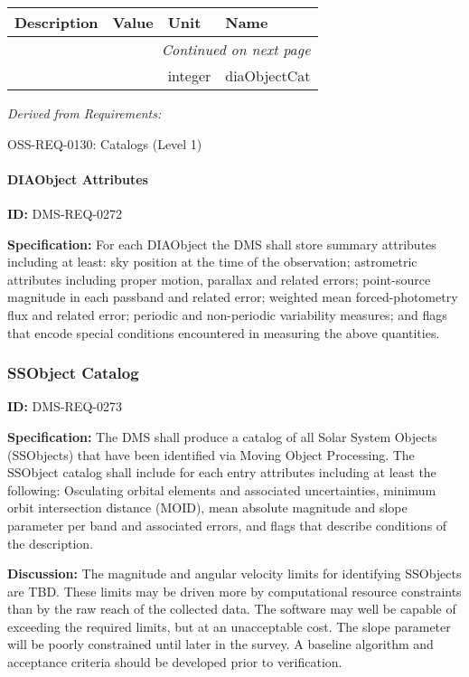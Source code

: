 \documentclass[SE,toc,lsstdraft]{lsstdoc}
\makeatletter
\newcommand{\paramname}[1]{\hspace{0pt}#1}
\newcommand{\unitname}[1]{\hspace{0pt}#1}
\newenvironment{parameters}[0]{%
\setlength\LTleft{0pt}
\setlength\LTright{\fill}
\begin{small}
\begin{longtable}[]{|p{0.5\textwidth}|l|p{0.6in}|p{1.74in}@{}|}

\hline \textbf{Description} & \textbf{Value} & \textbf{Unit} & \textbf{Name} \\ \hline
\endhead

\hline \multicolumn{4}{r}{\emph{Continued on next page}} \\
\endfoot

\hline\hline
\endlastfoot
}{%
\hline
\end{longtable}
\end{small}
}
\makeatother
\begin{document}
\begin{parameters}

&

&
\unitname{%
integer
}
&
\paramname{%
diaObjectCat
} \\\hline
\end{parameters}




\emph{Derived from Requirements:}

OSS-REQ-0130:
Catalogs (Level 1) \newline


\paragraph{DIAObject Attributes}\hfill  %

\label{DMS-REQ-0272}
\textbf{ID:} DMS-REQ-0272

\textbf{Specification:} For each DIAObject the DMS shall store summary attributes including at least: sky position at the time of the observation; astrometric attributes including proper motion, parallax and related errors; point-source magnitude in each passband and related error; weighted mean forced-photometry flux and related error; periodic and non-periodic variability measures; and flags that encode special conditions encountered in measuring the above quantities.






\subsubsection{SSObject Catalog}

\label{DMS-REQ-0273}
\textbf{ID:} DMS-REQ-0273

\textbf{Specification:} The DMS shall produce a catalog of all Solar System Objects (SSObjects) that have been identified via Moving Object Processing. The SSObject catalog shall include for each entry attributes including at least the following: Osculating orbital elements and associated uncertainties, minimum orbit intersection distance (MOID), mean absolute magnitude and slope parameter per band and associated errors, and flags that describe conditions of the description.

\textbf{Discussion: }The magnitude and angular velocity limits for identifying SSObjects are TBD. These limits may be driven more by computational resource constraints than by the raw reach of the collected data. The software may well be capable of exceeding the required limits, but at an unacceptable cost. The slope parameter will be poorly constrained until later in the survey. A baseline algorithm and acceptance criteria should be developed prior to verification.
\end{document}
